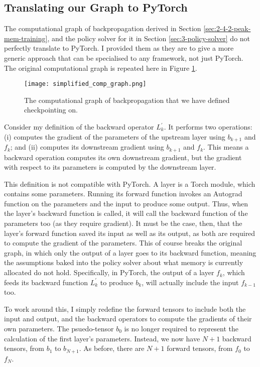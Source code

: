 \subsection{Translating our Graph to PyTorch}
The computational graph of backpropagation derived in Section \ref{sec:2-4-2-peak-mem-training}, and the policy solver for it in Section \ref{sec:3-policy-solver} do not perfectly translate to PyTorch.
I provided them as they are to give a more generic approach that can be specialised to any framework, not just PyTorch.
The original computational graph is repeated here in Figure \ref{fig:2-simplified-comp-graph}.

\begin{figure}[h]
    \centering
    \texttt{[image: simplified\_comp\_graph.png]}
    \caption{The computational graph of backpropagation that we have defined checkpointing on.}
    \label{fig:2-simplified-comp-graph}
\end{figure}

Consider my definition of the backward operator \(L_k^\prime\).
It performs two operations: (i) computes the gradient of the parameters of the upstream layer using \(b_{k+1}\) and \(f_k\); and (ii) computes its downstream gradient using \(b_{k+1}\) and \(f_k\).
This means a backward operation computes its own downstream gradient, but the gradient with respect to its parameters is computed by the downstream layer.

This definition is not compatible with PyTorch.
A layer is a Torch module, which contains some parameters.
Running its forward function invokes an Autograd function on the parameters and the input to produce some output.
Thus, when the layer's backward function is called, it will call the backward function of the parameters too (as they require gradient).
It must be the case, then, that the layer's forward function saved its input as well as its output, as both are required to compute the gradient of the parameters.
This of course breaks the original graph, in which only the output of a layer goes to its backward function, meaning the assumptions baked into the policy solver about what memory is currently allocated do not hold.
Specifically, in PyTorch, the output of a layer \(f_k\), which feeds its backward function \(L_k^\prime\) to produce \(b_k\), will actually include the input \(f_{k-1}\) too.

To work around this, I simply redefine the forward tensors to include both the input and output, and the backward operators to compute the gradients of their own parameters.
The psuedo-tensor \(b_0\) is no longer required to represent the calculation of the first layer's parameters.
Instead, we now have \(N+1\) backward tensors, from \(b_1\) to \(b_{N+1}\).
As before, there are \(N+1\) forward tensors, from \(f_0\) to \(f_N\).

